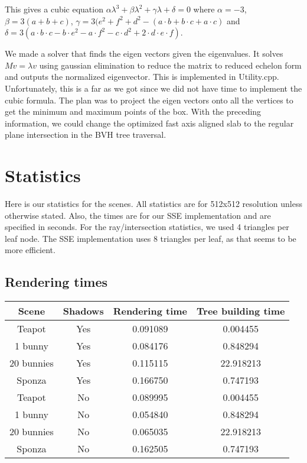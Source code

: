 \documentclass{article} %
\begin{document}
This gives a cubic equation $\alpha \lambda^3 + \beta \lambda^2 + \gamma \lambda + \delta = 0$ where $\alpha =-3$, $\beta=3(a + b + c)$, $\gamma=3(e^2 + f^2 + d^2 - (a\cdot b + b\cdot c + a\cdot c)$ and $\delta=3(a\cdot b\cdot c - b\cdot e^2 -a\cdot f^2 - c\cdot d^2 + 2\cdot d\cdot e\cdot f)$.

We made a solver that finds the eigen vectors given the eigenvalues.  It solves $Mv=\lambda v$ using gaussian elimination to reduce the matrix to reduced echelon form and outputs the normalized eigenvector. This is implemented in Utility.cpp. Unfortunately, this is a far as we got since we did not have time to implement the cubic formula. The plan was to project the eigen vectors onto all the vertices to get the minimum and maximum points of the box. With the preceding information, we could change the optimized fast axis aligned slab to the regular plane intersection in the BVH tree traversal. 

\section{Statistics}
Here is our statistics for the scenes. All statistics are for 512x512 resolution unless otherwise stated. Also, the times are for our SSE implementation and are specified in seconds. For the ray/intersection statistics, we used 4 triangles per leaf node. The SSE implementation uses 8 triangles per leaf, as that seems to be more efficient.

\subsection{Rendering times}
\begin{tabular}{cccc}
{\bf Scene} & {\bf Shadows} & {\bf Rendering time} & {\bf Tree building time}\\
\hline
Teapot      & Yes & 0.091089 & 0.004455\\
1 bunny     & Yes & 0.084176 & 0.848294\\
20 bunnies  & Yes & 0.115115 & 22.918213\\
Sponza      & Yes & 0.166750 & 0.747193\\
Teapot      & No  & 0.089995 & 0.004455\\
1 bunny     & No  & 0.054840 & 0.848294\\
20 bunnies  & No  & 0.065035 & 22.918213\\
Sponza      & No  & 0.162505 & 0.747193\\
\end{tabular}
\end{document}
